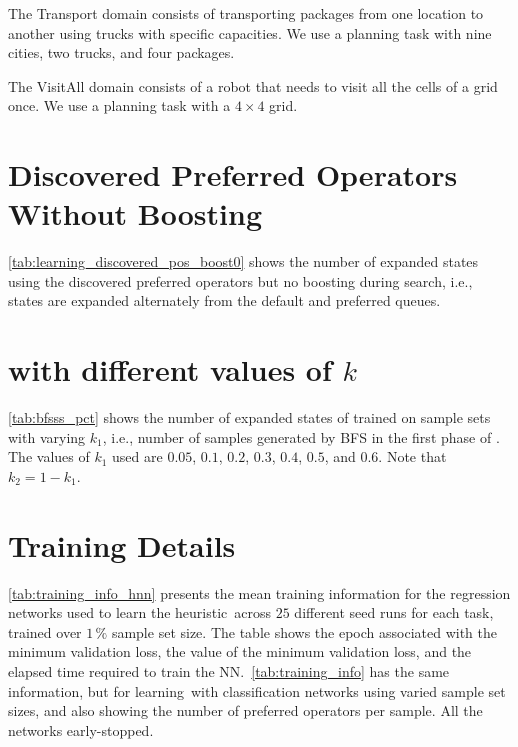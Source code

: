 \documentclass[ppgc,diss,english]{iiufrgs}
\begin{document}
The Transport domain consists of transporting packages from one location to another using trucks with specific capacities. We use a planning task with nine cities, two trucks, and four packages.

The VisitAll domain consists of a robot that needs to visit all the cells of a grid once. We use a planning task with a $4 \times 4$ grid.


\chapter[Preferred Operators Without Boosting]{Discovered Preferred Operators Without Boosting}
\label{cha:discovered_pos_boost0}
\cref{tab:learning_discovered_pos_boost0} shows the number of expanded states using the discovered preferred operators \pog but no boosting during search, i.e., states are expanded alternately from the default and preferred queues.



\chapter{\bfsrs with different values of $k$}
\label{cha:bfsss_pct}

\cref{tab:bfsss_pct} shows the number of expanded states of \pog trained on sample sets with varying $k_{1}$, i.e., number of samples generated by BFS in the first phase of \bfsrs. The values of $k_{1}$ used are $0.05$, $0.1$, $0.2$, $0.3$, $0.4$, $0.5$, and $0.6$. Note that $k_{2} = 1 - k_{1}$.



\chapter{Training Details}
\label{cha:training_details}

\cref{tab:training_info_hnn} presents the mean training information for the regression networks used to learn the heuristic~\hnn across $25$ different seed runs for each task, trained over $1\,\%$ sample set size. The table shows the epoch associated with the minimum validation loss, the value of the minimum validation loss, and the elapsed time required to train the NN.~\cref{tab:training_info} has the same information, but for learning~\pog with classification networks using varied sample set sizes, and also showing the number of preferred operators per sample. All the networks early-stopped.
\end{document}
